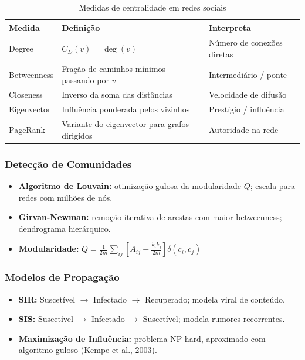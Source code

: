 \documentclass[12pt,a4paper]{article}
\begin{document}
\begin{table}[ht]
\centering
\caption{Medidas de centralidade em redes sociais}
\begin{tabular}{@{}lll@{}}
\toprule
\textbf{Medida} & \textbf{Definição} & \textbf{Interpreta} \\
\midrule
Degree & $C_D(v) = \deg(v)$ & Número de conexões diretas \\
Betweenness & Fração de caminhos mínimos passando por $v$ & Intermediário / ponte \\
Closeness & Inverso da soma das distâncias & Velocidade de difusão \\
Eigenvector & Influência ponderada pelos vizinhos & Prestígio / influência \\
PageRank & Variante do eigenvector para grafos dirigidos & Autoridade na rede \\
\bottomrule
\end{tabular}
\end{table}

\subsubsection{Detecção de Comunidades}

\begin{itemize}
  \item \textbf{Algoritmo de Louvain:} otimização gulosa da modularidade $Q$; escala para redes com milhões de nós.
  \item \textbf{Girvan-Newman:} remoção iterativa de arestas com maior betweenness; dendrograma hierárquico.
  \item \textbf{Modularidade:} $Q = \frac{1}{2m} \sum_{ij} \left[A_{ij} - \frac{k_i k_j}{2m}\right] \delta(c_i, c_j)$
\end{itemize}

\subsubsection{Modelos de Propagação}

\begin{itemize}
  \item \textbf{SIR:} Suscetível $\to$ Infectado $\to$ Recuperado; modela viral de conteúdo.
  \item \textbf{SIS:} Suscetível $\to$ Infectado $\to$ Suscetível; modela rumores recorrentes.
  \item \textbf{Maximização de Influência:} problema NP-hard, aproximado com algoritmo guloso (Kempe et al., 2003).
\end{itemize}
\end{document}
